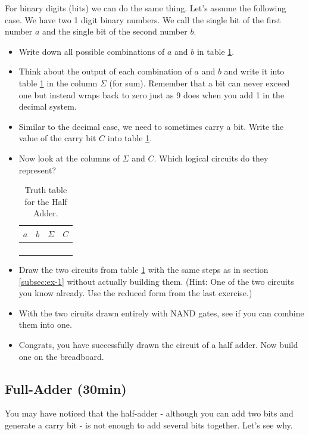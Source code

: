 \documentclass[10pt,a4paper]{article}
\begin{document}
For binary digits (bits) we can do the same thing. Let's assume the following case. We have two 1 digit binary numbers. We call the single bit of the first number $a$ and the single bit of the second number $b$.
\begin{itemize}
	\item Write down all possible combinations of $a$ and $b$ in table \ref{tab:half-adder-truth-table}.
	\item Think about the output of each combination of $a$ and $b$ and write it into table \ref{tab:half-adder-truth-table} in the column $\Sigma$ (for sum). Remember that a bit can never exceed one but instead wraps back to zero just as 9 does when you add 1 in the decimal system. 
	\item Similar to the decimal case, we need to sometimes carry a bit. Write the value of the carry bit $C$ into table \ref{tab:half-adder-truth-table}.
	\item Now look at the columns of $\Sigma$ and $C$. Which logical circuits do they represent?
	
	\begin{table}[H]
		\centering
		\begin{tabular}{|c|c||c|c|}
			\hline
			$a$ & $b$ & $\Sigma$   & $C$ \\ \hline
			&     &           &       \\ \hline
			&     &           &       \\ \hline
			&     &           &       \\ \hline
			&     &           &       \\ \hline
		\end{tabular}
		\caption{Truth table for the Half Adder.}
		\label{tab:half-adder-truth-table}
	\end{table}
	
	\item Draw the two circuits from table \ref{tab:half-adder-truth-table} with the same steps as in section \ref{subsec:ex-1} without actually building them. (Hint: One of the two circuits you know already. Use the reduced form from the last exercise.)
	\item With the two ciruits drawn entirely with NAND gates, see if you can combine them into one.
	\item Congrats, you have successfully drawn the circuit of a half adder. Now build one on the breadboard.
\end{itemize}
\subsection{Full-Adder (30min)}
You may have noticed that the half-adder - although you can add two bits and generate a carry bit - is not enough to add several bits together. Let's see why.
\end{document}

